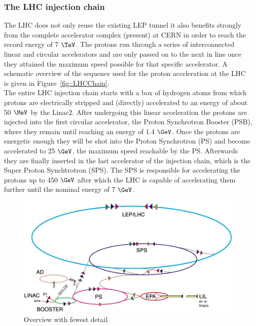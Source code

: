 \subsubsection{The LHC injection chain}
The LHC does not only reuse the existing LEP tunnel it also benefits strongly from the complete accelerator complex (present) at CERN in order to reach the record energy of 7 $\TeV$. 
The protons run through a series of interconnected linear and circular accelerators and are only passed on to the next in line once they attained the maximum speed possible for that specific accelerator. A schematic overview of the sequence used for the proton acceleration at the LHC is given in Figure~\ref{fig::LHCChain}.\\
The entire LHC injection chain starts with a box of hydrogen atoms from which protons are electrically stripped and (directly) accelerated to an energy of about 50 $\MeV$ by the Linac2.
After undergoing this linear acceleration the protons are injected into the first circular accelerator, the Proton Synchrotron Booster (PSB), where they remain until reaching an energy of 1.4 $\GeV$.
Once the protons are energetic enough they will be shot into the Proton Synchrotron (PS) and become accelerated to 25 $\GeV$, the maximum speed reachable by the PS.
Afterwards they are finally inserted in the last accelerator of the injection chain, which is the Super Proton Synchtrotron (SPS).
The SPS is responsible for accelerating the protons up to 450 $\GeV$ after which the LHC is capable of accelerating them further until the nominal energy of 7 $\GeV$.
\begin{figure}[h!t]
 \centering
 \includegraphics[width = 0.8 \textwidth]{Chapters/Chapter2_CERN/Figures/CERNAcceleratorComplex_Few.jpg}
 \caption{Overview with fewest detail}
\end{figure}

